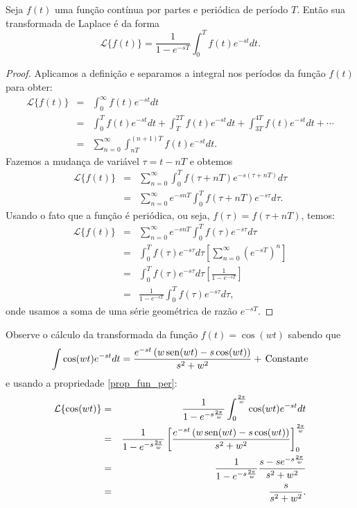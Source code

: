 \documentclass[Main.tex]{subfiles}
\begin{document}
\begin{propr}{\label{prop_fun_per}}Seja $f(t)$ uma função contínua por partes e periódica de período $T$. Então sua transformada de Laplace é da forma
$$
\mathcal{L}\{f(t)\}=\frac{1}{1-e^{-sT}}\int_0^Tf(t)e^{-st}dt.
$$
\end{propr}
\begin{proof}Aplicamos a definição e separamos a integral nos períodos da função $f(t)$ para obter:
\begin{eqnarray*}
 \mathcal{L}\{f(t)\}&=&\int_0^\infty f(t)e^{-st}dt \\
 &=&\int_0^T f(t)e^{-st}dt+\int_T^{2T} f(t)e^{-st}dt+\int_{3T}^{4T} f(t)e^{-st}dt+\cdots\\
 &=&\sum_{n=0}^\infty \int_{nT}^{(n+1)T} f(t)e^{-st}dt.
\end{eqnarray*}
Fazemos a mudança de variável $\tau=t-nT$ e obtemos
 \begin{eqnarray*}
 \mathcal{L}\{f(t)\}&=&\sum_{n=0}^\infty \int_{0}^{T} f(\tau+nT)e^{-s(\tau+nT)}d\tau\\
 &=&\sum_{n=0}^\infty e^{-snT} \int_{0}^{T} f(\tau+nT)e^{-s\tau}d\tau.
 \end{eqnarray*}
 Usando o fato que a função é periódica, ou seja, $f(\tau)=f(\tau+nT)$, temos:
 \begin{eqnarray*}
  \mathcal{L}\{f(t)\}&=&\sum_{n=0}^\infty e^{-snT} \int_{0}^{T} f(\tau)e^{-s\tau}d\tau\\
 &=&\int_{0}^{T} f(\tau)e^{-s\tau}d\tau\left[\sum_{n=0}^\infty \left(e^{-sT}\right)^n \right]\\
 &=&\int_{0}^{T} f(\tau)e^{-s\tau}d\tau\left[\frac{1}{1-e^{-sT}} \right]\\
 &=&\frac{1}{1-e^{-sT}}\int_{0}^{T} f(\tau)e^{-s\tau}d\tau,
\end{eqnarray*}
onde usamos a soma de uma série geométrica de razão $e^{-sT}$.
 \end{proof}
\begin{ex}Observe o cálculo da transformada da função $f(t)=\cos(wt)$ sabendo que
$$
\int \cos(wt)e^{-st}dt=\frac{e^{-st}\left(w\sen(wt)-s\cos(wt)\right)}{s^2+w^2}+\ \!\hbox{Constante}
$$
e usando a propriedade \ref{prop_fun_per}:
\begin{eqnarray*} 
\mathcal{L}\{\cos(wt)\}&=&\frac{1}{1-e^{-s\frac{2\pi }{w}}}\int_0^{\frac{2\pi }{w}}\cos(wt)e^{-st}dt\\
&=&\frac{1}{1-e^{-s\frac{2\pi }{w}}}\left[\frac{e^{-st}\left(w\operatorname{sen}(wt)-s\cos(wt)\right)}{s^2+w^2}\right]_0^{\frac{2\pi }{w}}\\
&=&\frac{1}{1-e^{-s\frac{2\pi }{w}}}\frac{s-se^{-s\frac{2\pi }{w}}}{s^2+w^2}\\
&=&\frac{s}{s^2+w^2}.
\end{eqnarray*}
 
\end{ex}
\end{document}
